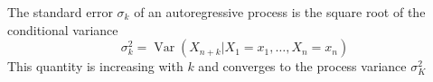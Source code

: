 \documentclass[11pt]{article}
\theoremstyle{definition}
\newcommand*\Var[1]{\mathop{\text{Var}}\left(#1\right)}
\begin{document}
The standard error $\sigma_k$ of an autoregressive process is the square root of the conditional variance
\begin{equation*}
	\sigma_k^2 = \Var{X_{n+k}|X_1= x_1,\dots, X_n = x_n}
\end{equation*}
This quantity is increasing with $k$ and converges to the process variance $\sigma_K^2$
\end{document}
